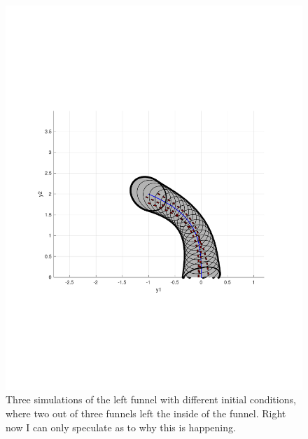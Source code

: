 \begin{figure}
  \includegraphics[scale=0.5]{figures/funnel/left_simulation}
  \caption{Three simulations of the left funnel with different initial
    conditions, where two out of three funnels left the inside of the funnel.
    Right now I can only speculate as to why this is happening.}
\end{figure}


